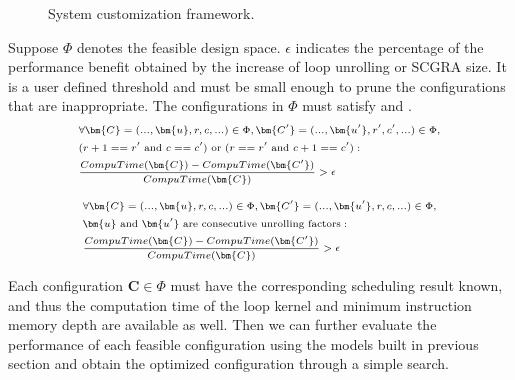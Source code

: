\begin{figure}[t]
\caption{System customization framework.}
\label{fig:customization-framework}
\end{figure}

Suppose $\Phi$ denotes the feasible design space. $\epsilon$ indicates the
percentage of the performance benefit obtained by the increase 
of loop unrolling or SCGRA size. It is a user defined 
threshold and must be small enough to prune the configurations that are 
inappropriate. The configurations in $\Phi$ must satisfy  
and . 
\begin{equation} \label{eq:cond1}
    \scriptsize
    \begin{split}
        &\forall \bm{C}=(...,\bm{u},r,c,...)\in \Phi, \bm{C'}=(...,\bm{u'},r',c',...) \in \Phi,\\ 
        & (r+1==r' \text{ and } c==c') \text{ or } (r==r' \text{ and } c+1==c'): \\ 
        &\frac{CompuTime(\bm{C})-CompuTime(\bm{C'})}{CompuTime(\bm{C})} > \epsilon \\
    \end{split}
\end{equation}

\begin{equation} \label{eq:cond2}
    \scriptsize
    \begin{split}
        &\forall \bm{C}=(...,\bm{u},r,c,...) \in \Phi, \bm{C'}=(...,\bm{u'},r,c,...) \in \Phi,\\ 
        &\bm{u} \text{ and } \bm{u'} \text{ are consecutive unrolling factors}: \\
        &\frac{CompuTime(\bm{C})-CompuTime(\bm{C'})}{CompuTime(\bm{C})} > \epsilon
    \end{split}
\end{equation}

Each configuration $\bm{C} \in \Phi$ must have the corresponding 
scheduling result known, and thus the computation time of the 
loop kernel and minimum instruction memory depth are available as well. Then we can further evaluate 
the performance of each feasible configuration using the models built in 
previous section and obtain the optimized configuration through a simple search.


